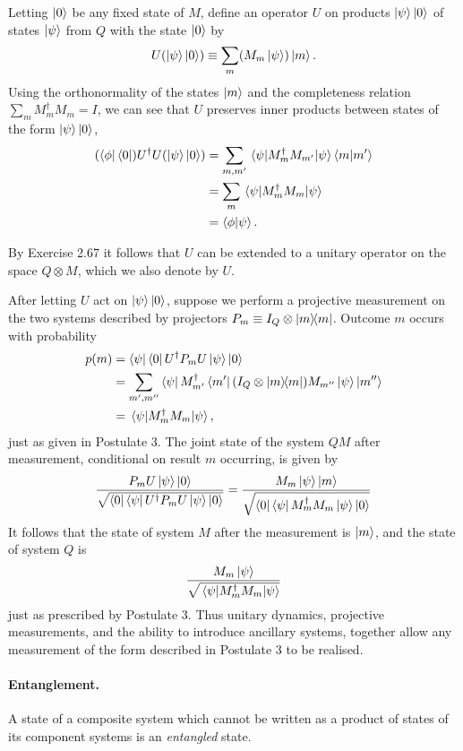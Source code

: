 \documentclass{article}
\numberwithin{theorem}{section}
\numberwithin{corollary}{section}
\numberwithin{postulate}{section}
\begin{document}
Letting $\ket{0}$ be any fixed state of $M$, define an operator $U$ on products
$\ket{\psi}\ket{0}$ of states $\ket{\psi}$ from $Q$ with the state $\ket{0}$ by
\[
  U(\ket{\psi}\ket{0}) \equiv \sum_m (M_m\ket{\psi})\ket{m}.
\] Using the orthonormality of the states $\ket{m}$ and the completeness
relation $\sum_m M_m^{\dagger}M_m = I$, we can see that $U$ preserves inner
products between states of the form $\ket{\psi}\ket{0}$,
\begin{align*}
  (\bra{\phi}\bra{0})U^{\dagger}U(\ket{\psi}\ket{0})
  &= \sum_{m, m'} \ev{M_m^{\dagger}M_{m'}}{\psi}\braket{m}{m'} \\
  &= \sum_m \ev{M_m^{\dagger}M_m}{\psi} \\
  &= \braket{\phi}{\psi}.
\end{align*}

By Exercise 2.67 it follows that $U$ can be extended to a unitary operator on
the space $Q \otimes M$, which we also denote by $U$.

After letting $U$ act on $\ket{\psi}\ket{0}$, suppose we perform a projective
measurement on the two systems described by projectors $P_m \equiv I_Q \otimes
\op{m}{m}$. Outcome $m$ occurs with probability
\begin{align*}
  p(m)
  &= \bra{\psi}\bra{0}U^{\dagger}P_mU\ket{\psi}\ket{0} \\
  &= \sum_{m', m''} \bra{\psi}M_{m'}^{\dagger}\bra{m'} (I_Q \otimes \op{m}{m})
    M_{m''}\ket{\psi}\ket{m''} \\
  &= \ev{M_m^{\dagger}M_m}{\psi},
\end{align*}
just as given in Postulate 3. The joint state of the system $QM$ after
measurement, conditional on result $m$ occurring, is given by \[
  \frac{P_mU\ket{\psi}\ket{0}}{\sqrt{
    \bra{0}\bra{\psi}U^{\dagger}P_mU\ket{\psi}\ket{0}
  }} = \frac{M_m\ket{\psi}\ket{m}}{\sqrt{
    \bra{0}\bra{\psi}M_m^{\dagger}M_m\ket{\psi}\ket{0}
  }}
\] It follows that the state of system $M$ after the measurement is $\ket{m}$,
and the state of system $Q$ is \[
  \frac{M_m\ket{\psi}}{\sqrt{\ev{M_m^{\dagger}M_m}{\psi}}}
\] just as prescribed by Postulate 3. Thus unitary dynamics, projective
measurements, and the ability to introduce ancillary systems, together allow
any measurement of the form described in Postulate 3 to be realised.

\paragraph{Entanglement.} A state of a composite system which cannot be written
as a product of states of its component systems is an \emph{entangled} state.
\end{document}
